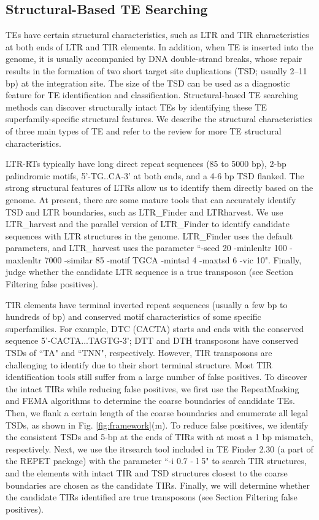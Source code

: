 \documentclass{bmcart}
\begin{document}
\subsection*{Structural-Based TE Searching}
TEs have certain structural characteristics, such as LTR and TIR characteristics at both ends of LTR and TIR elements. In addition, when TE is inserted into the genome, it is usually accompanied by DNA double-strand breaks, whose repair results in the formation of two short target site duplications (TSD; usually 2–11 bp) at the integration site. The size of the TSD can be used as a diagnostic feature for TE identification and classification. Structural-based TE searching methods can discover structurally intact TEs by identifying these TE superfamily-specific structural features. We describe the structural characteristics of three main types of TE and refer to the review for more TE structural characteristics\cite{wicker2007unified}.

LTR-RTs typically have long direct repeat sequences (85 to 5000 bp), 2-bp palindromic motifs, 5'-TG..CA-3' at both ends, and a 4-6 bp TSD flanked. The strong structural features of LTRs allow us to identify them directly based on the genome. At present, there are some mature tools that can accurately identify TSD and LTR boundaries, such as LTR\_Finder and LTRharvest. We use LTR\_harvest and the parallel version of LTR\_Finder\cite{ou2019ltr_finder_parallel} to identify candidate sequences with LTR structures in the genome. LTR\_Finder uses the default parameters, and LTR\_harvest uses the parameter ``-seed 20 -minlenltr 100 -maxlenltr 7000 -similar 85 -motif TGCA -mintsd 4 -maxtsd 6 -vic 10".  Finally, judge whether the candidate LTR sequence is a true transposon (see Section Filtering false positives).

TIR elements have terminal inverted repeat sequences (usually a few bp to hundreds of bp) and conserved motif characteristics of some specific superfamilies. For example, DTC (CACTA) starts and ends with the conserved sequence 5'-CACTA...TAGTG-3'; DTT and DTH transposons have conserved TSDs of ``TA" and ``TNN", respectively. However, TIR transposons are challenging to identify due to their short terminal structure. Most TIR identification tools still suffer from a large number of false positives. To discover the intact TIRs while reducing false positives, we first use the RepeatMasking and FEMA algorithms to determine the coarse boundaries of candidate TEs. Then, we flank a certain length of the coarse boundaries and enumerate all legal TSDs, as shown in Fig. \ref{fig:framework}(m). To reduce false positives, we identify the consistent TSDs and 5-bp at the ends of TIRs with at most a 1 bp mismatch, respectively. Next, we use the itrsearch tool included in TE Finder 2.30 (a part of the REPET\cite{quesneville2010repet} package) with the parameter ``-i 0.7 - l 5" to search TIR structures, and the elements with intact TIR and TSD structures closest to the coarse boundaries are chosen as the candidate TIRs. Finally, we will determine whether the candidate TIRs identified are true transposons (see Section Filtering false positives). 
\end{document}
